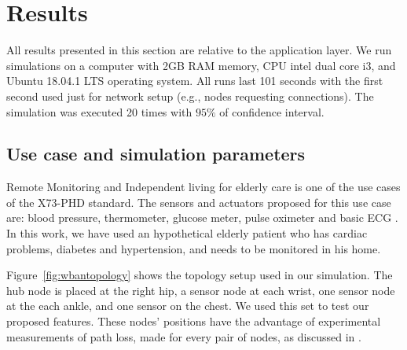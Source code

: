 \section{Results}\label{results}
All results presented in this section are relative to the application layer. We run simulations on a computer with 2GB RAM memory, CPU intel dual core i3, and Ubuntu 18.04.1 LTS operating system. All runs last 101 seconds with the first second used just for network setup (e.g., nodes requesting connections). The simulation was executed 20 times with $95\%$ of confidence interval.

\subsection{Use case and simulation parameters}

Remote Monitoring and Independent living for elderly care is one of the use cases of the X73-PHD standard. The sensors and actuators proposed for this use case are: blood pressure, thermometer, glucose meter, pulse oximeter and basic ECG  \cite{b3}. In this work, we have used an hypothetical elderly patient who has cardiac problems, diabetes and hypertension, and needs to be monitored in his home.

Figure~\ref{fig:wbantopology} shows the topology setup used in our simulation. The hub node is placed at the right hip, a sensor node at each wrist, one sensor node at the each ankle, and one sensor on the chest. We used this set to test our proposed features. These nodes' positions have the advantage of experimental measurements of path loss, made for every pair of nodes, as discussed in \cite{b4}.

